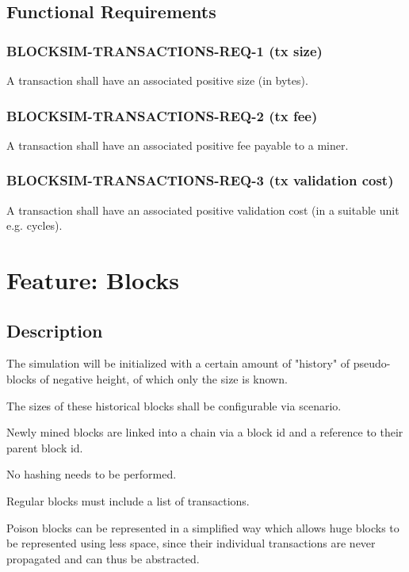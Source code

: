 \documentclass{scrreprt}
\begin{document}
    \subsection{Functional Requirements}

      \subsubsection{BLOCKSIM-TRANSACTIONS-REQ-1 (tx size)}

        A transaction shall have an associated positive size (in bytes).

      \subsubsection{BLOCKSIM-TRANSACTIONS-REQ-2 (tx fee)}

        A transaction shall have an associated positive fee payable to a miner.

      \subsubsection{BLOCKSIM-TRANSACTIONS-REQ-3 (tx validation cost)}

        A transaction shall have an associated positive validation cost (in a
        suitable unit e.g. cycles).

  \section{Feature: Blocks}

    \subsection{Description}

      The simulation will be initialized with a certain amount of "history" of
      pseudo-blocks of negative height, of which only the size is known.

      The sizes of these historical blocks shall be configurable via scenario.

      Newly mined blocks are linked into a chain via a block id and a reference
      to their parent block id.

      No hashing needs to be performed.

      Regular blocks must include a list of transactions.

      Poison blocks can be represented in a simplified way which allows huge
      blocks to be represented using less space, since their individual
      transactions are never propagated and can thus be abstracted.
\end{document}
